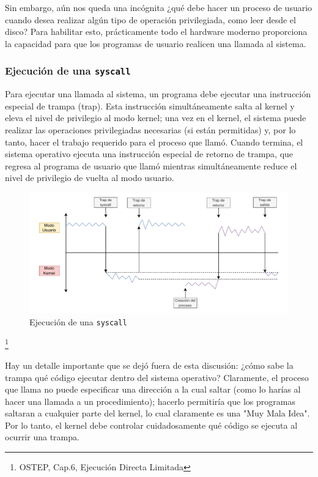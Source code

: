 \documentclass{article}
\begin{document}
Sin embargo, aún nos queda una incógnita ¿qué debe hacer un proceso de usuario cuando desea realizar algún tipo de operación privilegiada, como leer desde el disco? Para habilitar esto, prácticamente todo el hardware moderno proporciona la capacidad para que los programas de usuario realicen una llamada al sistema.

\subsubsection{Ejecución de una \texttt{syscall}}
Para ejecutar una llamada al sistema, un programa debe ejecutar una instrucción especial de trampa (trap). Esta instrucción simultáneamente salta al kernel y eleva el nivel de privilegio al modo kernel; una vez en el kernel, el sistema puede realizar las operaciones privilegiadas necesarias (si están permitidas) y, por lo tanto, hacer el trabajo requerido para el proceso que llamó. Cuando termina, el sistema operativo ejecuta una instrucción especial de retorno de trampa, que regresa al programa de usuario que llamó mientras simultáneamente reduce el nivel de privilegio de vuelta al modo usuario.

\newpage
\begin{figure}[h]
    \centering
    \includegraphics[width=1\textwidth]{src/syscall.pdf}
    \caption{Ejecución de una \texttt{syscall}}
\end{figure} \footnote{OSTEP, Cap.6, Ejecución Directa Limitada}

Hay un detalle importante que se dejó fuera de esta discusión: ¿cómo sabe la trampa qué código ejecutar dentro del sistema operativo? Claramente, el proceso que llama no puede especificar una dirección a la cual saltar (como lo harías al hacer una llamada a un procedimiento); hacerlo permitiría que los programas saltaran a cualquier parte del kernel, lo cual claramente es una "Muy Mala Idea". Por lo tanto, el kernel debe controlar cuidadosamente qué código se ejecuta al ocurrir una trampa.
\end{document}
